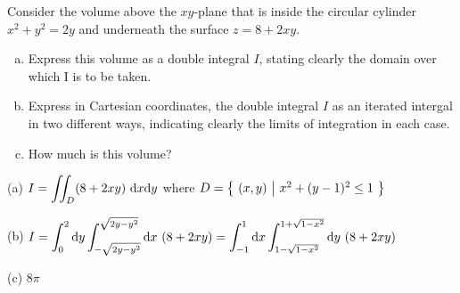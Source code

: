 \begin{question}[M200 2002A] %
Consider the volume above the $xy$-plane that is inside
the circular cylinder $x^2+y^2=2y$ and underneath the surface $z=8+2xy$.
\begin{enumerate}[(a)]
\item
 Express this volume as a double integral $I$, stating clearly
the domain over which I is to be taken.

\item 
Express in Cartesian coordinates, the double integral $I$
as an iterated intergal in two different ways, indicating clearly the limits
of integration in each case.

\item
How much is this volume?
\end{enumerate}
\end{question}


\begin{answer}
(a) $\dst I=\dblInt_D (8+2xy)\ \dee{x}\dee{y}$ where 
    $D=\big\{ \ (x,y)\ \big|\ x^2+(y-1)^2\le 1\ \big\}$

(b) $\dst I
  =\int_0^2 \dee{y}\int_{-\sqrt{2y-y^2}}^{\sqrt{2y-y^2}}\dee{x}\ (8+2xy) 
  =\int_{-1}^1 \dee{x}\int_{1-\sqrt{1-x^2}}^{1+\sqrt{1-x^2}}\dee{y}\ (8+2xy)$

(c) $8\pi$
\end{answer}

